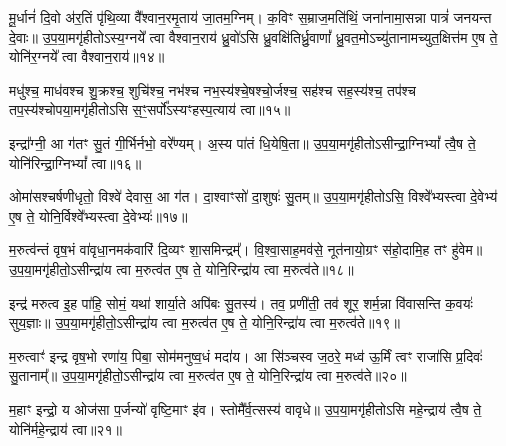 मू॒र्धानं॑ दि॒वो अ॑र॒तिं पृ॑थि॒व्या वै᳚श्वान॒रमृ॒ताय॑ जा॒तम॒ग्निम्। क॒विꣳ स॒म्राज॒मति॑थिं॒ जना॑नामा॒सन्ना पात्रं॑ जनयन्त दे॒वाः॥ उ॒प॒या॒मगृ॑हीतो\-ऽस्य॒ग्नये᳚ त्वा वैश्वान॒राय॑ ध्रु॒वो॑\-ऽसि ध्रु॒वक्षि॑तिर्ध्रु॒वाणां᳚ ध्रु॒वत॒मो\-ऽच्यु॑तानामच्युत॒क्षित्त॑म ए॒ष ते॒ योनि॑र॒ग्नये᳚ त्वा वैश्वान॒राय॑॥१४॥

{\anuvakamend[{मू॒र्धानं॒ पञ्च॑त्रिꣳशत्॥13॥}]}

मधु॑श्च॒ माध॑वश्च शु॒क्रश्च॒ शुचि॑श्च॒ नभ॑श्च नभ॒स्य॑श्चे॒षश्चो॒र्जश्च॒ सह॑श्च सह॒स्य॑श्च॒ तप॑श्च तप॒स्य॑श्चोपया॒मगृ॑हीतो\-ऽसि स॒ꣳ॒सर्पो᳚\-ऽस्यꣳहस्प॒त्याय॑ त्वा॥१५॥

{\anuvakamend[{मधु॑स्त्रि॒ꣳ॒शत्॥14॥}]}

इन्द्रा᳚ग्नी॒ आ ग॑तꣳ सु॒तं गी॒र्भिर्नभो॒ वरे᳚ण्यम्। अ॒स्य पा॑तं धि॒येषि॒ता॥ उ॒प॒या॒मगृ॑हीतो\-ऽसीन्द्रा॒ग्नि\-भ्यां᳚ त्वै॒ष ते॒ योनि॑रिन्द्रा॒ग्नि\-भ्यां᳚ त्वा॥१६॥

{\anuvakamend[{इन्द्रा᳚ग्नी विꣳश॒तिः॥15॥}]}

ओमा॑सश्चर्\mbox{}षणीधृतो॒ विश्वे॑ देवास॒ आ ग॑त। दा॒श्वाꣳसो॑ दा॒शुषः॑ सु॒तम्॥ उ॒प॒या॒मगृ॑हीतो\-ऽसि॒ विश्वे᳚भ्यस्त्वा दे॒वेभ्य॑ ए॒ष ते॒ योनि॒र्विश्वे᳚भ्यस्त्वा दे॒वेभ्यः॑॥१७॥

{\anuvakamend[{इन्द्रा᳚ग्नी॒ ओमा॑सो विꣳश॒तिर्विꣳ॑शतिः॥16॥}]}

म॒रुत्व॑न्तं वृष॒भं वा॑वृधा॒नमक॑वारिं दि॒व्यꣳ शा॒समिन्द्रम्᳚। वि॒श्वा॒साह॒मव॑से॒ नूत॑नायो॒ग्रꣳ स॑हो॒दामि॒ह तꣳ हु॑वेम॥ उ॒प॒या॒मगृ॑हीतो॒\-ऽसीन्द्रा॑य त्वा म॒रुत्व॑त ए॒ष ते॒ योनि॒रिन्द्रा॑य त्वा म॒रुत्व॑ते॥१८॥

{\anuvakamend[{म॒रुत्व॑न्त॒ꣳ॒ षड्विꣳ॑शतिः॥17॥}]}

इन्द्र॑ मरुत्व इ॒ह पा॑हि॒ सोमं॒ यथा॑ शार्या॒ते अपि॑बः सु॒तस्य॑। तव॒ प्रणी॑ती॒ तव॑ शूर॒ शर्म॒न्ना वि॑वासन्ति क॒वयः॑ सुय॒ज्ञाः॥ उ॒प॒या॒मगृ॑हीतो॒\-ऽसीन्द्रा॑य त्वा म॒रुत्व॑त ए॒ष ते॒ योनि॒रिन्द्रा॑य त्वा म॒रुत्व॑ते॥१९॥

{\anuvakamend[{इन्द्रैका॒न्नत्रि॒ꣳ॒शत्॥18॥}]}

म॒रुत्वाꣳ॑ इन्द्र वृष॒भो रणा॑य॒ पिबा॒ सोम॑मनुष्व॒धं मदा॑य। आ सि॑ञ्चस्व ज॒ठरे॒ मध्व॑ ऊ॒र्मिं त्वꣳ राजा॑सि प्र॒दिवः॑ सु॒तानाम्᳚॥ उ॒प॒या॒मगृ॑हीतो॒\-ऽसीन्द्रा॑य त्वा म॒रुत्व॑त ए॒ष ते॒ योनि॒रिन्द्रा॑य त्वा म॒रुत्व॑ते॥२०॥

{\anuvakamend[{इन्द्र॑ मरुत्वो म॒रुत्वा॒नेका॒न्न त्रि॒ꣳ॒शदेका॒न्न त्रि॒ꣳ॒शत्॥19॥}]}

म॒हाꣳ इन्द्रो॒ य ओज॑सा प॒र्जन्यो॑ वृष्टि॒माꣳ इ॑व। स्तोमै᳚र्व॒त्सस्य॑ वावृधे॥ उ॒प॒या॒मगृ॑हीतो\-ऽसि महे॒न्द्राय॑ त्वै॒ष ते॒ योनि॑र्महे॒न्द्राय॑ त्वा॥२१॥

